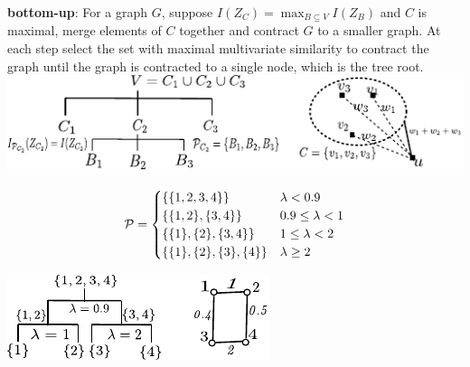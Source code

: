\documentclass[portrait,final,a0paper,fontscale=0.3]{baposter}
\begin{document}
\begin{poster}
{\textbf{bottom-up}: For a graph $G$, suppose $I(Z_C) = \max_{B\subseteq V} I(Z_B)$ and $C$ is maximal, merge elements of $C$ together and contract $G$ to a smaller graph. At each step select the set with maximal multivariate similarity to contract the graph until the graph is contracted to a single node, which is the tree root. \\

\includegraphics[width=0.9\linewidth]{img/two_approach.pdf}

\begin{equation*}
	\P = 
	\begin{cases}
		\{\{1,2,3,4\}\} & \lambda < 0.9 \\
		\{\{1,2\},\{3,4\}\} & 0.9 \leq \lambda < 1 \\
		\{\{1\},\{2\},\{3,4\}\} & 1 \leq \lambda < 2\\
		\{\{1\},\{2\},\{3\},\{4\}\} & \lambda \geq 2
	\end{cases}
\end{equation*}

\includegraphics[width=0.77\linewidth]{img/threshold.pdf}
}

\end{poster}
\end{document}
